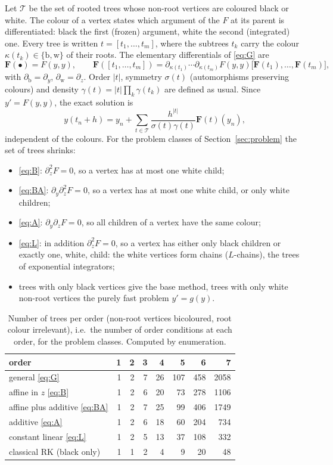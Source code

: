 \documentclass[11pt,a4paper]{article}
\theoremstyle{definition}
\theoremstyle{remark}
\newcommand{\T}{\mathcal{T}}
\begin{document}
Let $\T$ be the set of rooted trees whose non-root vertices are coloured black or white. The colour of a vertex states
which argument of the $F$ at its parent is differentiated: black the first (frozen) argument, white the second
(integrated) one. Every tree is written $t=[t_1,\dots,t_m]$, where the subtrees $t_k$ carry the colour
$\kappa(t_k)\in\{\mathrm b,\mathrm w\}$ of their roots. The elementary differentials of \eqref{eq:G} are
\[
 \mathbf F(\bullet)=F(y,y),\qquad
 \mathbf F([t_1,\dots,t_m])=\partial_{\kappa(t_1)}\cdots\partial_{\kappa(t_m)}F(y,y)\big[\mathbf F(t_1),\dots,\mathbf F(t_m)\big],
\]
with $\partial_{\mathrm b}=\partial_y$, $\partial_{\mathrm w}=\partial_z$. Order $|t|$, symmetry $\sigma(t)$ (automorphisms
preserving colours) and density $\gamma(t)=|t|\prod_k\gamma(t_k)$ are defined as usual. Since $y'=F(y,y)$, the exact
solution is
\[
 y(t_n+h)=y_n+\sum_{t\in\T}\frac{h^{|t|}}{\sigma(t)\gamma(t)}\mathbf F(t)(y_n),
\]
independent of the colours. For the problem classes of Section~\ref{sec:problem} the set of trees shrinks:
\begin{itemize}
\item \eqref{eq:B}: $\partial_z^2F=0$, so a vertex has at most one white child;
\item \eqref{eq:BA}: $\partial_y\partial_z^2F=0$, so a vertex has at most one white child, or only white children;
\item \eqref{eq:A}: $\partial_y\partial_zF=0$, so all children of a vertex have the same colour;
\item \eqref{eq:L}: in addition $\partial_z^2F=0$, so a vertex has either only black children or exactly one, white,
  child: the white vertices form chains ($L$-chains), the trees of exponential integrators;
\item trees with only black vertices give the base method, trees with only white non-root vertices the purely fast
  problem $y'=g(y)$.
\end{itemize}

\begin{table}[ht]
\centering
\caption{Number of trees per order (non-root vertices bicoloured, root colour irrelevant), i.e.\ the number of order
conditions at each order, for the problem classes. Computed by enumeration.}
\label{tab:treecount}
\begin{tabular}{lrrrrrrr}
\toprule
order & 1 & 2 & 3 & 4 & 5 & 6 & 7\\\midrule
general \eqref{eq:G} & 1 & 2 & 7 & 26 & 107 & 458 & 2058\\
affine in $z$ \eqref{eq:B} & 1 & 2 & 6 & 20 & 73 & 278 & 1106\\
affine plus additive \eqref{eq:BA} & 1 & 2 & 7 & 25 & 99 & 406 & 1749\\
additive \eqref{eq:A} & 1 & 2 & 6 & 18 & 60 & 204 & 734\\
constant linear \eqref{eq:L} & 1 & 2 & 5 & 13 & 37 & 108 & 332\\
classical RK (black only) & 1 & 1 & 2 & 4 & 9 & 20 & 48\\
\bottomrule
\end{tabular}
\end{table}
\end{document}
